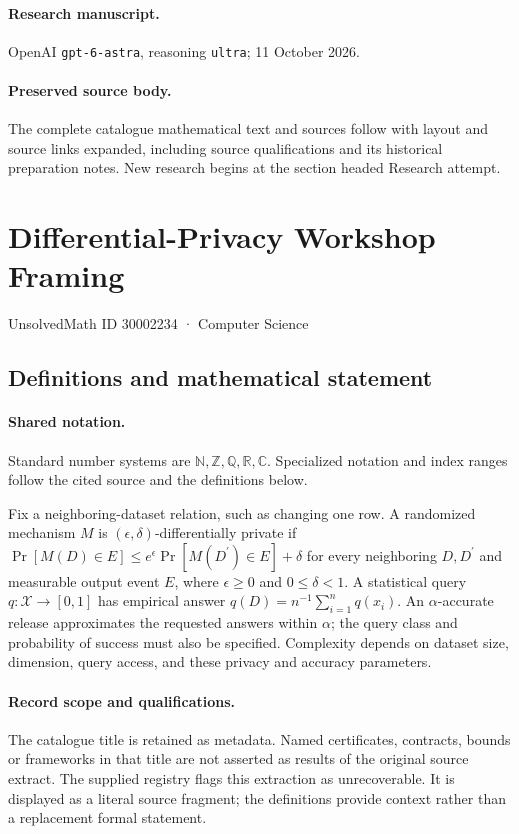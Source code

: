 \documentclass[11pt]{article}
\begin{document}
\paragraph{Research manuscript.} OpenAI \texttt{gpt-6-astra}, reasoning \texttt{ultra}; 11 October 2026.
\paragraph{Preserved source body.} The complete catalogue mathematical text and sources follow with layout and source links expanded, including source qualifications and its historical preparation notes. New research begins at the section headed Research attempt.

\section{Differential-Privacy Workshop Framing}\label{30002234}
{\small UnsolvedMath ID 30002234 · Computer Science}
\subsection{Definitions and mathematical statement}

\paragraph{Shared notation.}Standard number systems are $\mathbb N,\mathbb Z,\mathbb Q,\mathbb R,\mathbb C$. Specialized notation and index ranges follow the cited source and the definitions below.


Fix a neighboring-dataset relation, such as changing one row. A randomized mechanism $M$ is $(\epsilon,\delta)$-differentially private if $\Pr[M(D)\in E]\le e^\epsilon\Pr[M(D^{\prime})\in E]+\delta$ for every neighboring $D,D^{\prime}$ and measurable output event $E$, where $\epsilon\ge0$ and $0\le\delta<1$. A statistical query $q:\mathcal X\to[0,1]$ has empirical answer $q(D)=n^{-1}\sum_{i=1}^n q(x_i)$. An $\alpha$-accurate release approximates the requested answers within $\alpha$; the query class and probability of success must also be specified. Complexity depends on dataset size, dimension, query access, and these privacy and accuracy parameters.
\paragraph{Record scope and qualifications.}
The catalogue title is retained as metadata. Named certificates, contracts, bounds or frameworks in that title are not asserted as results of the original source extract.
The supplied registry flags this extraction as unrecoverable. It is displayed as a literal source fragment; the definitions provide context rather than a replacement formal statement.
\end{document}
